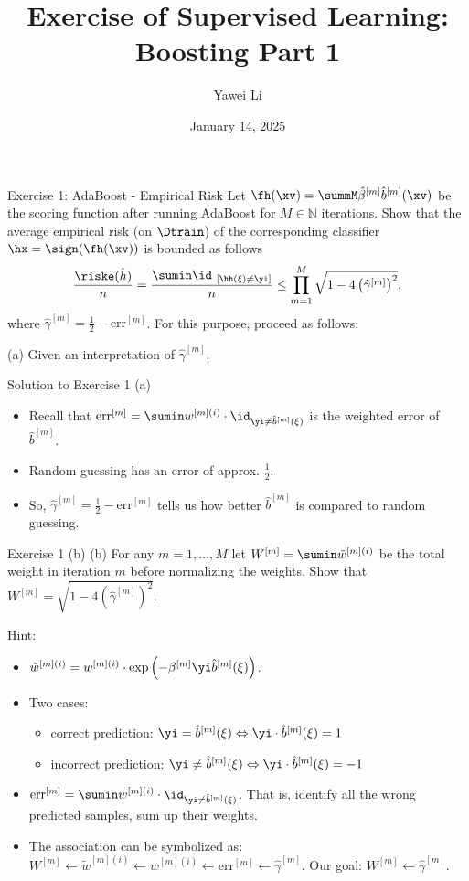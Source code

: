 \documentclass[aspectratio=169]{beamer}
\title[]{\textbf{Exercise of Supervised Learning: \\ Boosting Part 1}}
\author{Yawei Li}
\institute[LMU]
{
\\
  \texttt{yawei.li@stat.uni-muenchen.de}
}
\date{January 14, 2025}
\newcommand{\betahm}{\hat{\beta}^{[m]}}
\newcommand{\bhm}{\hat{b}^{[m]}}
\newcommand{\gammahm}{\hat{\gamma}^{[m]}}
\newcommand{\idhxneqy}{\id_{\ [\hh\left(\xi\right) \neq \yi]}}
\newcommand{\errm}{\mathrm{err}^{[m]}}
\newcommand{\prodmM}{\prod_{m=1}^M}
\newcommand{\Wm}{W^{[m]}}
\newcommand{\wmi}{w^{[m] (i)}}
\newcommand{\wtmi}{\tilde{w}^{[m](i)}}
\newcommand{\betam}{\beta^{[m]}}
\begin{document}
\begin{frame}
\titlepage

\end{frame}



\begin{frame}{Exercise 1: AdaBoost - Empirical Risk}
	Let $\fh(\xv) = \summM \betahm \bhm (\xv) $ be the scoring function after running AdaBoost for $M \in \mathbb{N}$ iterations. Show that the average empirical risk (on $\Dtrain$) of the corresponding classifier $\hx = \sign (\fh(\xv))$ is bounded as follows
	\begin{align}
		\frac{\riske (\hat{h})}{n} = \frac{\sumin \idhxneqy}{n} \leq \prodmM \sqrt{1 - 4 \left(\gammahm\right)^2},
	\end{align}
	where $\gammahm = \frac{1}{2} - \errm$. For this purpose, proceed as follows:
	
	(a) Given an interpretation of $\gammahm$.
\end{frame}

\begin{frame}{Solution to Exercise 1 (a)}
	\begin{itemize}
		\item<1-> Recall that $\errm = \sumin \wmi \cdot \id_{\yi \neq \bhm(\xi)}$ is the weighted error of $\bhm$.
		\item<2-> Random guessing has an error of approx. $\frac{1}{2}$.
		\item<3-> So, $\gammahm = \frac{1}{2} - \errm$ tells us how better $\bhm$ is compared to random guessing.
	\end{itemize}
	
\end{frame}

\begin{frame}{Exercise 1 (b)}
	(b) For any $m = 1, \ldots, M$ let $\Wm = \sumin \wtmi$ be the total weight in iteration $m$ before normalizing the weights. Show that $\Wm = \sqrt{1 - 4\left(\gammahm \right)^2}$.
	
	Hint:
	\begin{itemize}
		\item $\wtmi = \wmi \cdot \exp \left( - \betam \yi \bhm(\xi) \right)$.
		\item<2-> Two cases: 
			\begin{itemize}
				\item correct prediction: $\yi = \bhm(\xi) \Leftrightarrow \yi \cdot \bhm(\xi) = 1$
				\item incorrect prediction: $\yi \neq \bhm(\xi) \Leftrightarrow \yi \cdot \bhm(\xi) = -1$
			\end{itemize}
		\item<3-> $\errm = \sumin \wmi \cdot \id_{\yi \neq \bhm(\xi)}$. That is, identify all the wrong predicted samples, sum up their weights.
		\item<4-> The association can be symbolized as: $\Wm \leftarrow \wtmi \leftarrow \wmi \leftarrow \errm \leftarrow \gammahm$. Our goal: $\Wm \leftarrow \gammahm$.
	\end{itemize}
\end{frame}
\end{document}
